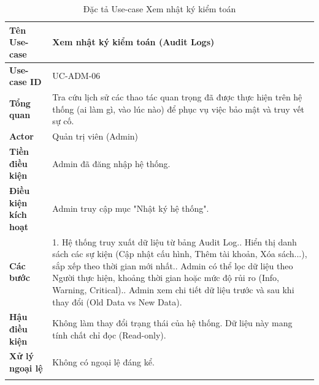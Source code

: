 \newpage
\begin{longtable}{|p{3.5cm}|p{11.5cm}|}
    \hline
    \textbf{Tên Use-case} & \textbf{Xem nhật ký kiểm toán (Audit Logs)} \\
    \hline
    \textbf{Use-case ID} & UC-ADM-06 \\
    \hline
    \textbf{Tổng quan} & Tra cứu lịch sử các thao tác quan trọng đã được thực hiện trên hệ thống (ai làm gì, vào lúc nào) để phục vụ việc bảo mật và truy vết sự cố. \\
    \hline
    \textbf{Actor} & Quản trị viên (Admin) \\
    \hline
    \textbf{Tiền điều kiện} & Admin đã đăng nhập hệ thống. \\
    \hline
    \textbf{Điều kiện kích hoạt} & Admin truy cập mục "Nhật ký hệ thống". \\
    \hline
    \textbf{Các bước} & 
    1. Hệ thống truy xuất dữ liệu từ bảng Audit Log.\newline
    2. Hiển thị danh sách các sự kiện (Cập nhật cấu hình, Thêm tài khoản, Xóa sách...), sắp xếp theo thời gian mới nhất.\newline
    3. Admin có thể lọc dữ liệu theo Người thực hiện, khoảng thời gian hoặc mức độ rủi ro (Info, Warning, Critical).\newline
    4. Admin xem chi tiết dữ liệu trước và sau khi thay đổi (Old Data vs New Data). \\
    \hline
    \textbf{Hậu điều kiện} & Không làm thay đổi trạng thái của hệ thống. Dữ liệu này mang tính chất chỉ đọc (Read-only). \\
    \hline
    \textbf{Xử lý ngoại lệ} & Không có ngoại lệ đáng kể. \\
    \hline
    \caption{Đặc tả Use-case Xem nhật ký kiểm toán}
\end{longtable}

